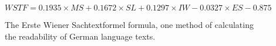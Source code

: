 \begin{figure}
	\caption[Erste Wiener Sachtextformel Formula]{The Erste Wiener Sachtextformel formula, one method of calculating the readability of German language texts. }
	\label{fig:wst}
	\begin{center}
		\begin{math}
		WSTF = 0.1935 \times MS + 0.1672 \times SL + 0.1297 \times IW - 0.0327 \times ES - 0.875
		\end{math}
	\end{center}
\end{figure}